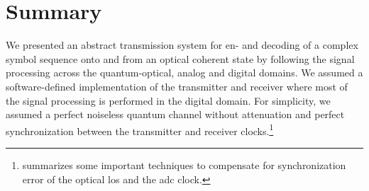 \section*{Summary}

We presented an abstract transmission system for en- and decoding of a complex symbol sequence onto and from an optical coherent state by following the signal processing across the quantum-optical, analog and digital domains.
We assumed a software-defined implementation of the transmitter and receiver where most of the signal processing is performed in the digital domain.
For simplicity, we assumed a perfect noiseless quantum channel without attenuation and perfect synchronization between the transmitter and receiver clocks.\footnote{ summarizes some important techniques to compensate for synchronization error of the optical \glspl{lo} and the \gls{adc} clock.}

